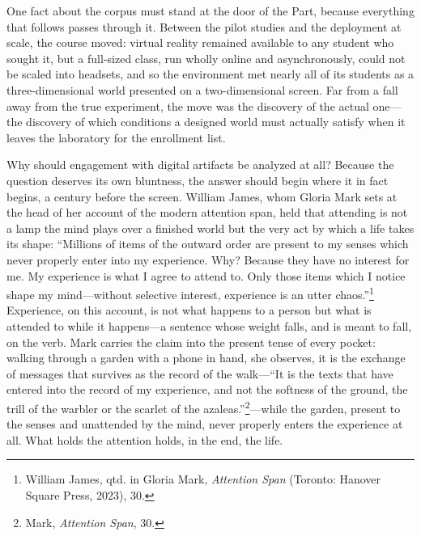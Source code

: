 One fact about the corpus must stand at the door of the Part, because everything that follows passes through it. Between the pilot studies and the deployment at scale, the course moved: virtual reality remained available to any student who sought it, but a full-sized class, run wholly online and asynchronously, could not be scaled into headsets, and so the environment met nearly all of its students as a three-dimensional world presented on a two-dimensional screen. Far from a fall away from the true experiment, the move was the discovery of the actual one---the discovery of which conditions a designed world must actually satisfy when it leaves the laboratory for the enrollment list.

Why should engagement with digital artifacts be analyzed at all? Because the question deserves its own bluntness, the answer should begin where it in fact begins, a century before the screen. William James, whom Gloria Mark sets at the head of her account of the modern attention span, held that attending is not a lamp the mind plays over a finished world but the very act by which a life takes its shape: ``Millions of items of the outward order are present to my senses which never properly enter into my experience. Why? Because they have no interest for me. My experience is what I agree to attend to. Only those items which I notice shape my mind---without selective interest, experience is an utter chaos.''\footnote{William James, qtd. in Gloria Mark, \textit{Attention Span} (Toronto: Hanover Square Press, 2023), 30.} Experience, on this account, is not what happens to a person but what is attended to while it happens---a sentence whose weight falls, and is meant to fall, on the verb. Mark carries the claim into the present tense of every pocket: walking through a garden with a phone in hand, she observes, it is the exchange of messages that survives as the record of the walk---``It is the texts that have entered into the record of my experience, and not the softness of the ground, the trill of the warbler or the scarlet of the azaleas.''\footnote{Mark, \textit{Attention Span}, 30.}---while the garden, present to the senses and unattended by the mind, never properly enters the experience at all. What holds the attention holds, in the end, the life.


